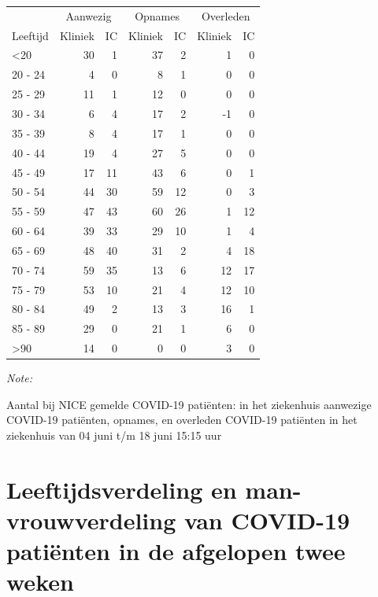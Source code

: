 \documentclass[
  english,
  man,floatsintext]{apa6}
\begin{document}
\begin{table}
\centering\begingroup\fontsize{10}{12}\selectfont

\begin{threeparttable}
\begin{tabular}{lrrrrrr}
\toprule
\multicolumn{1}{c}{ } & \multicolumn{2}{c}{Aanwezig} & \multicolumn{2}{c}{Opnames} & \multicolumn{2}{c}{Overleden} \\
\cmidrule(l{3pt}r{3pt}){2-3} \cmidrule(l{3pt}r{3pt}){4-5} \cmidrule(l{3pt}r{3pt}){6-7}
Leeftijd & Kliniek & IC & Kliniek & IC & Kliniek & IC\\
\midrule
<20 & 30 & 1 & 37 & 2 & 1 & 0\\
20 - 24 & 4 & 0 & 8 & 1 & 0 & 0\\
25 - 29 & 11 & 1 & 12 & 0 & 0 & 0\\
30 - 34 & 6 & 4 & 17 & 2 & -1 & 0\\
35 - 39 & 8 & 4 & 17 & 1 & 0 & 0\\
40 - 44 & 19 & 4 & 27 & 5 & 0 & 0\\
45 - 49 & 17 & 11 & 43 & 6 & 0 & 1\\
50 - 54 & 44 & 30 & 59 & 12 & 0 & 3\\
55 - 59 & 47 & 43 & 60 & 26 & 1 & 12\\
60 - 64 & 39 & 33 & 29 & 10 & 1 & 4\\
65 - 69 & 48 & 40 & 31 & 2 & 4 & 18\\
70 - 74 & 59 & 35 & 13 & 6 & 12 & 17\\
75 - 79 & 53 & 10 & 21 & 4 & 12 & 10\\
80 - 84 & 49 & 2 & 13 & 3 & 16 & 1\\
85 - 89 & 29 & 0 & 21 & 1 & 6 & 0\\
>90 & 14 & 0 & 0 & 0 & 3 & 0\\
\bottomrule
\end{tabular}
\begin{tablenotes}
\item \textit{Note: } 
\item Aantal bij NICE gemelde COVID-19 patiënten: in het ziekenhuis aanwezige COVID-19 patiënten, opnames, en overleden COVID-19 patiënten in het ziekenhuis van 04 juni t/m 18 juni 15:15 uur
\end{tablenotes}
\end{threeparttable}
\endgroup{}
\end{table}

\newpage

\hypertarget{leeftijdsverdeling-en-man-vrouwverdeling-van-covid-19-patiuxebnten-in-de-afgelopen-twee-weken}{%
\section{Leeftijdsverdeling en man-vrouwverdeling van COVID-19 patiënten in de afgelopen twee weken}\label{leeftijdsverdeling-en-man-vrouwverdeling-van-covid-19-patiuxebnten-in-de-afgelopen-twee-weken}}
\end{document}
